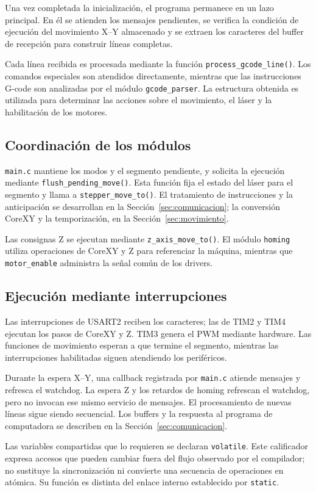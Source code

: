\documentclass[blue,fullpaper]{ludusofficial}  %
\begin{document}
Una vez completada la inicialización,
el programa permanece en un lazo principal.
En él se atienden los mensajes pendientes,
se verifica la condición de ejecución
del movimiento X--Y almacenado y se extraen
los caracteres del buffer de recepción
para construir líneas completas.

Cada línea recibida es procesada mediante
la función \texttt{process\_gcode\_line()}.
Los comandos especiales son atendidos
directamente, mientras que las instrucciones
G-code son analizadas por el módulo
\texttt{gcode\_parser}. La estructura obtenida
es utilizada para determinar las acciones
sobre el movimiento, el láser y la habilitación
de los motores.

\subsection{Coordinación de los módulos}
\texttt{main.c} mantiene los modos y el segmento pendiente, y solicita la ejecución mediante \texttt{flush\_pending\_move()}. Esta función fija el estado del láser para el segmento y llama a \texttt{stepper\_move\_to()}. El tratamiento de instrucciones y la anticipación se desarrollan en la Sección~\ref{sec:comunicacion}; la conversión CoreXY y la temporización, en la Sección~\ref{sec:movimiento}.

Las consignas Z se ejecutan mediante \texttt{z\_axis\_move\_to()}. El módulo \texttt{homing} utiliza operaciones de CoreXY y Z para referenciar la máquina, mientras que \texttt{motor\_enable} administra la señal común de los drivers.

\subsection{Ejecución mediante interrupciones}
Las interrupciones de USART2 reciben los caracteres; las de TIM2 y TIM4 ejecutan los pasos de CoreXY y Z. TIM3 genera el PWM mediante hardware. Las funciones de movimiento esperan a que termine el segmento, mientras las interrupciones habilitadas siguen atendiendo los periféricos.

Durante la espera X--Y, una callback registrada por \texttt{main.c} atiende mensajes y refresca el watchdog. La espera Z y los retardos de homing refrescan el watchdog, pero no invocan ese mismo servicio de mensajes. El procesamiento de nuevas líneas sigue siendo secuencial. Los buffers y la respuesta al programa de computadora se describen en la Sección~\ref{sec:comunicacion}.

Las variables compartidas que lo requieren se declaran \texttt{volatile}. Este calificador expresa accesos que pueden cambiar fuera del flujo observado por el compilador; no sustituye la sincronización ni convierte una secuencia de operaciones en atómica. Su función es distinta del enlace interno establecido por \texttt{static}.
\end{document}
